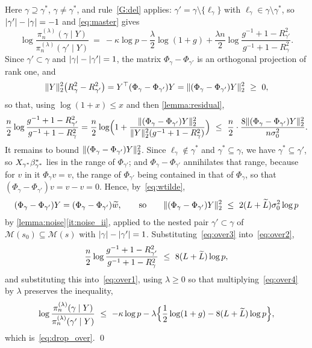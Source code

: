 Here $\gamma\supseteq\gamma^{\ast}$, $\gamma\neq\gamma^{\ast}$, and
rule~\ref{G:del} applies: $\gamma'=\gamma\setminus\{\ell_\gamma\}$ with
$\ell_\gamma\in\gamma\setminus\gamma^\ast$, so
$\lvert\gamma'\rvert-\lvert\gamma\rvert=-1$ and \eqref{eq:master} gives
\begin{equation}
    \label{eq:over1}
    \log\frac{\pi_n^{(\lambda)}(\gamma\mid Y)}
    {\pi_n^{(\lambda)}(\gamma'\mid Y)}
    \ =\ -\kappa\log p-\frac{\lambda}{2}\log(1+g)
    +\frac{\lambda n}{2}
    \log\frac{g^{-1}+1-R^{2}_{\gamma'}}{g^{-1}+1-R^{2}_{\gamma}} .
\end{equation}
Since $\gamma'\subset\gamma$ and $\lvert\gamma\rvert-\lvert\gamma'\rvert=1$, the matrix
$\Phi_\gamma-\Phi_{\gamma'}$ is an orthogonal projection of rank one, and
\begin{equation}
    \label{eq:over1b}
    \lVert Y\rVert_2^{2}\bigl(R^{2}_{\gamma}-R^{2}_{\gamma'}\bigr)
    =Y^{\top}(\Phi_\gamma-\Phi_{\gamma'})Y
    =\lVert(\Phi_\gamma-\Phi_{\gamma'})Y\rVert_2^{2}\ \geq\ 0 ,
\end{equation}
so that, using $\log(1+x)\leq x$ and then \cref{lemma:residual},
\begin{equation}
    \label{eq:over2}
    \frac n2\log\frac{g^{-1}+1-R^{2}_{\gamma'}}
    {g^{-1}+1-R^{2}_{\gamma}}
    =\frac n2\log\Bigl(1+\frac{\lVert(\Phi_\gamma-\Phi_{\gamma'})
        Y\rVert_2^{2}}{\lVert Y\rVert_2^{2}(g^{-1}+1-R^{2}_{\gamma})}\Bigr)
    \ \leq\ \frac n2\cdot
    \frac{8\lVert(\Phi_\gamma-\Phi_{\gamma'})Y\rVert_2^{2}}{n\sigma_0^{2}} .
\end{equation}
It remains to bound $\lVert(\Phi_\gamma-\Phi_{\gamma'})Y\rVert_2^{2}$. Since
$\ell_\gamma\notin\gamma^\ast$ and $\gamma^{\ast}\subseteq\gamma$, we have
$\gamma^{\ast}\subseteq\gamma'$, so $X_{\gamma^{\ast}}\beta^{\ast}_{\gamma^{\ast}}$ lies in the range of
$\Phi_{\gamma'}$; and $\Phi_\gamma-\Phi_{\gamma'}$ annihilates that range,
because for $v$ in it $\Phi_\gamma v=v$, the range of $\Phi_{\gamma'}$
being contained in that of $\Phi_\gamma$, so that
$(\Phi_\gamma-\Phi_{\gamma'})v=v-v=0$. Hence, by~\eqref{eq:wtilde},
\begin{equation}
    \label{eq:over3}
    (\Phi_\gamma-\Phi_{\gamma'})Y
    =(\Phi_\gamma-\Phi_{\gamma'})\widetilde w,
    \qquad\text{so}\qquad
    \lVert(\Phi_\gamma-\Phi_{\gamma'})Y\rVert_2^{2}
    \ \leq\ 2(L+\widetilde{L})\sigma_0^{2}\log p
\end{equation}
by \cref{lemma:noise}\ref{it:noise_ii}, applied to the nested pair
$\gamma'\subset\gamma$ of
$\mathscr{M}(s_0)\subseteq\mathscr{M}(s)$ with
$\lvert\gamma\rvert-\lvert\gamma'\rvert=1$. Substituting~\eqref{eq:over3}
into~\eqref{eq:over2},
\begin{equation}
    \label{eq:over4}
    \frac n2\log\frac{g^{-1}+1-R^{2}_{\gamma'}}
    {g^{-1}+1-R^{2}_{\gamma}}\ \leq\ 8(L+\widetilde{L})\log p ,
\end{equation}
and substituting this into~\eqref{eq:over1}, using $\lambda\geq0$ so that
multiplying~\eqref{eq:over4} by $\lambda$ preserves the inequality,
\begin{equation*}
    \log\frac{\pi_n^{(\lambda)}(\gamma\mid Y)}
    {\pi_n^{(\lambda)}(\gamma'\mid Y)}
    \ \leq\ -\kappa\log p
    -\lambda\Bigl\{\frac12\log(1+g)-8(L+\widetilde{L})\log p\Bigr\} ,
\end{equation*}
which is~\eqref{eq:drop_over}. \qed

